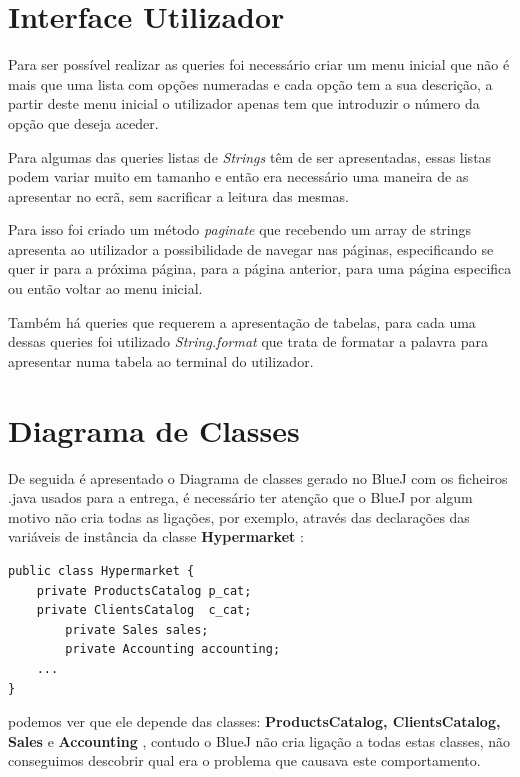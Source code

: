 \documentclass[10pt] {article}
\begin{document}
\newpage
\section{Interface Utilizador}

Para ser possível realizar as queries foi necessário criar um menu inicial que não é mais que uma lista com opções numeradas e cada opção tem a sua descrição, a partir deste menu inicial o utilizador apenas tem que introduzir o número da opção que deseja aceder.

Para algumas das queries listas de \emph{Strings} têm de ser apresentadas, essas listas podem variar muito  em tamanho e então era necessário uma maneira de as apresentar no ecrã, sem sacrificar a leitura das mesmas.

Para isso foi criado um método \emph{paginate} que recebendo um array de strings apresenta ao utilizador a possibilidade de navegar nas páginas, especificando se quer ir para a próxima página, para a página anterior, para uma página especifica ou então voltar ao menu inicial.

Também há queries que requerem a apresentação de tabelas, para cada uma dessas queries foi utilizado \emph{String.format} que trata de formatar a palavra para apresentar numa tabela ao terminal do utilizador.
\newpage
\section{Diagrama de Classes}
\par De seguida é apresentado o Diagrama de classes gerado no BlueJ com os ficheiros .java usados para a entrega, é
necessário ter atenção que o BlueJ por algum motivo não cria todas as ligações, por exemplo, através das declarações das
variáveis de instância da classe \color{blue} \textbf{Hypermarket} \color{black}:

\begin{lstlisting}
public class Hypermarket {
	private ProductsCatalog p_cat;
   	private ClientsCatalog  c_cat;
    	private Sales sales;
    	private Accounting accounting;
	...
}
\end{lstlisting}

\par podemos ver que ele depende das classes: \color{blue} \textbf{ProductsCatalog, ClientsCatalog, Sales} \color{black} e
\color{blue} \textbf{Accounting} \color{black}, contudo o BlueJ não cria ligação a todas estas classes, não conseguimos
descobrir qual era o problema que causava este comportamento.
\end{document}
